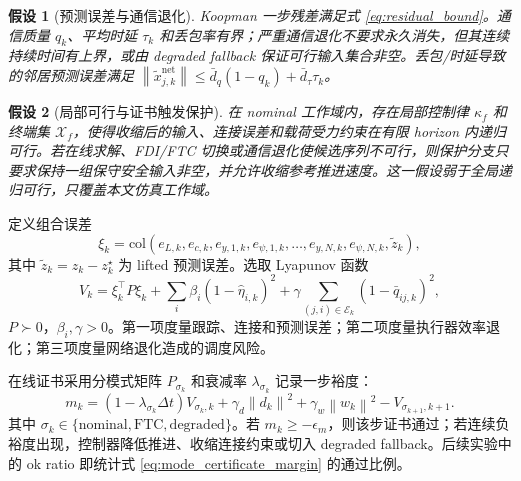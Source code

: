 \documentclass[twocolumn,3p,times,procedia]{elsarticle}
\newcommand{\norm}[1]{\left\lVert #1 \right\rVert}
\newtheorem{assumption}{假设}
\begin{document}
\begin{assumption}[预测误差与通信退化]
Koopman 一步残差满足式 \eqref{eq:residual_bound}。通信质量 $q_k$、平均时延 $\tau_k$ 和丢包率有界；严重通信退化不要求永久消失，但其连续持续时间有上界，或由 degraded fallback 保证可行输入集合非空。丢包/时延导致的邻居预测误差满足 $\norm{\tilde x_{j,k}^{\mathrm{net}}}\le \bar d_q(1-q_k)+\bar d_\tau \tau_k$。
\end{assumption}

\begin{assumption}[局部可行与证书触发保护]
在 nominal 工作域内，存在局部控制律 $\kappa_f$ 和终端集 $\mathcal X_f$，使得收缩后的输入、连接误差和载荷受力约束在有限 horizon 内递归可行。若在线求解、FDI/FTC 切换或通信退化使候选序列不可行，则保护分支只要求保持一组保守安全输入非空，并允许收缩参考推进速度。这一假设弱于全局递归可行，只覆盖本文仿真工作域。
\end{assumption}

定义组合误差
\begin{equation}
\xi_k=\mathrm{col}\left(e_{L,k},e_{c,k},e_{y,1,k},e_{\psi,1,k},\ldots,e_{y,N,k},e_{\psi,N,k},\tilde z_k\right),
\label{eq:xi_def}
\end{equation}
其中 $\tilde z_k=z_k-z_k^\star$ 为 lifted 预测误差。选取 Lyapunov 函数
\begin{equation}
V_k=\xi_k^\top P\xi_k+\sum_i \beta_i(1-\hat\eta_{i,k})^2+\gamma\sum_{(j,i)\in\mathcal E_k}(1-\bar q_{ij,k})^2 ,
\label{eq:lyapunov}
\end{equation}
$P\succ0$，$\beta_i,\gamma>0$。第一项度量跟踪、连接和预测误差；第二项度量执行器效率退化；第三项度量网络退化造成的调度风险。

在线证书采用分模式矩阵 $P_{\sigma_k}$ 和衰减率 $\lambda_{\sigma_k}$ 记录一步裕度：
\begin{equation}
m_k=(1-\lambda_{\sigma_k}\Delta t)V_{\sigma_k,k}
+\gamma_d\norm{d_k}^2+\gamma_w\norm{w_k}^2
-V_{\sigma_{k+1},k+1}.
\label{eq:mode_certificate_margin}
\end{equation}
其中 $\sigma_k\in\{\mathrm{nominal},\mathrm{FTC},\mathrm{degraded}\}$。若 $m_k\ge -\epsilon_m$，则该步证书通过；若连续负裕度出现，控制器降低推进、收缩连接约束或切入 degraded fallback。后续实验中的 ok ratio 即统计式 \eqref{eq:mode_certificate_margin} 的通过比例。
\end{document}
